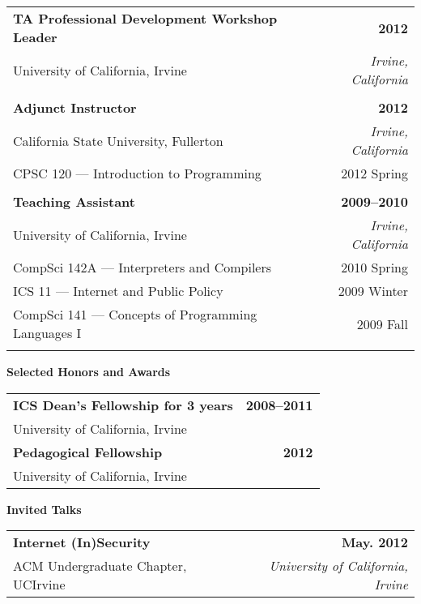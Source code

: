 {\begin{tabular*}{1\textwidth}{@{\extracolsep{\fill}}lr}
  \textbf{TA Professional Development Workshop Leader} & \textbf{2012} \\
  University of California, Irvine & \emph{Irvine, California} \\
  \\

  \textbf{Adjunct Instructor} & \textbf{2012} \\
  California State University, Fullerton & \emph{Irvine, California} \\
  CPSC 120 --- Introduction to Programming & 2012 Spring \\
  \\

  \textbf{Teaching Assistant} & \textbf{2009--2010} \\
  University of California, Irvine & \emph{Irvine, California} \\
  CompSci 142A --- Interpreters and Compilers & 2010 Spring \\
  ICS 11 ---  Internet and Public Policy & 2009 Winter \\
  CompSci 141 --- Concepts of Programming Languages I & 2009 Fall \\

\pagebreak

\end{tabular*}

\vspace{12pt}
\textbf{Selected Honors and Awards}

\begin{tabular*}{1\textwidth}{@{\extracolsep{\fill}}lr}
  \textbf{ICS Dean's Fellowship for 3 years} & \textbf{2008--2011} \\
  \vspace{6pt}
  University of California, Irvine & \\
  \textbf{Pedagogical Fellowship} & \textbf{2012} \\
  \vspace{6pt}
  University of California, Irvine & \\
\end{tabular*}

\vspace{12pt}
\textbf{Invited Talks}

\begin{tabular*}{1\textwidth}{@{\extracolsep{\fill}}lr}
  \textbf{Internet (In)Security} & \textbf{May. 2012} \\
  \vspace{6pt}
  ACM Undergraduate Chapter, UCIrvine & \textit{University of California, Irvine} \\
\end{tabular*}

}
